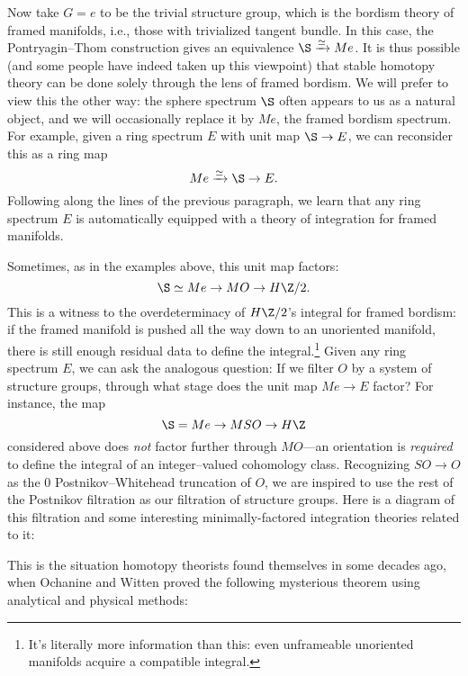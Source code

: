Now take $G = e$ to be the trivial structure group, which is the bordism theory of framed manifolds, i.e., those with trivialized tangent bundle.  In this case, the Pontryagin--Thom construction gives an equivalence $\S \xrightarrow{\simeq} Me$.  It is thus possible (and some people have indeed taken up this viewpoint) that stable homotopy theory can be done solely through the lens of framed bordism.  We will prefer to view this the other way: the sphere spectrum $\S$ often appears to us as a natural object, and we will occasionally replace it by $Me$, the framed bordism spectrum.  For example, given a ring spectrum $E$ with unit map $\S \to E$, we can reconsider this as a ring map \[Me \xrightarrow{\simeq} \S \to E.\]  Following along the lines of the previous paragraph, we learn that any ring spectrum $E$ is automatically equipped with a theory of integration for framed manifolds.

Sometimes, as in the examples above, this unit map factors: \[\S \simeq Me \to MO \to H\Z/2.\]  This is a witness to the overdeterminacy of $H\Z/2$'s integral for framed bordism: if the framed manifold is pushed all the way down to an unoriented manifold, there is still enough residual data to define the integral.\footnote{It's literally more information than this: even unframeable unoriented manifolds acquire a compatible integral.}  Given any ring spectrum $E$, we can ask the analogous question: If we filter $O$ by a system of structure groups, through what stage does the unit map $Me \to E$ factor?  For instance, the map \[\S = Me \to MSO \to H\Z\] considered above does \emph{not} factor further through $MO$---an orientation is \emph{required} to define the integral of an integer--valued cohomology class.  Recognizing $SO \to O$ as the $0${\th} Postnikov--Whitehead truncation of $O$, we are inspired to use the rest of the Postnikov filtration as our filtration of structure groups.  Here is a diagram of this filtration and some interesting minimally-factored integration theories related to it:
\begin{center}
\end{center}

This is the situation homotopy theorists found themselves in some decades ago, when Ochanine and Witten proved the following mysterious theorem using analytical and physical methods:

